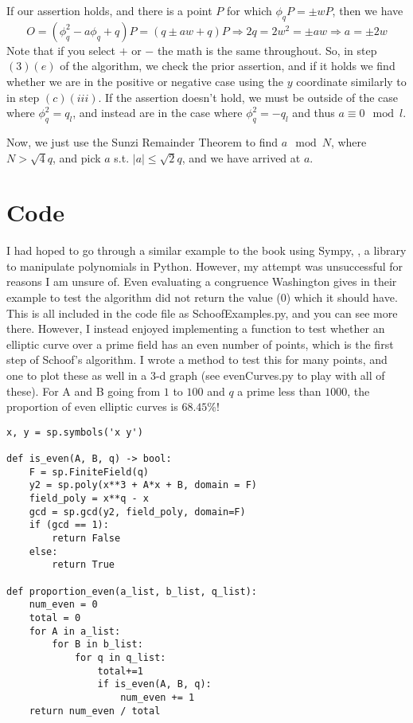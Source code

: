 \documentclass[11pt,reqno]{amsart}
\theoremstyle{definition}
\begin{document}
If our assertion holds, and there is a point $P$ for which $\phi_qP = \pm wP$, then we have $$O = (\phi_q^2 - a\phi_q+q)P = (q\pm aw+q)P \Rightarrow 2q = 2w^2 = \pm aw \Rightarrow a = \pm2w$$ Note that if you select $+$ or $-$ the math is the same throughout. So, in step $(3)(e)$ of the algorithm, we check the prior assertion, and if it holds we find whether we are in the positive or negative case using the $y$ coordinate similarly to in step $(c)(iii)$. If the assertion doesn't hold, we must be outside of the case where $\phi_q^2 = q_l$, and instead are in the case where $\phi_q^2 = -q_l$ and thus $a \equiv 0 \mod l$. 

Now, we just use the Sunzi Remainder Theorem to find $a \mod N$, where $N>\sqrt{4}q$, and pick $a$ s.t. $|a| \leq \sqrt{2}q$, and we have arrived at $a$. 





\section{Code}

I had hoped to go through a similar example to the book using Sympy, \cite{sympy}, a library to manipulate polynomials in Python. However, my attempt was unsuccessful for reasons I am unsure of. Even evaluating a congruence Washington gives in their example to test the algorithm did not return the value ($0$) which it should have. This is all included in the code file as SchoofExamples.py, and you can see more there. However, I instead enjoyed implementing a function to test whether an elliptic curve over a prime field has an even number of points, which is the first step of Schoof's algorithm. I wrote a method to test this for many points, and one to plot these as well in a 3-d graph (see evenCurves.py to play with all of these). For A and B going from $1$ to $100$ and $q$ a prime less than $1000$, the proportion of even elliptic curves is $68.45$\%!

\begin{lstlisting}
x, y = sp.symbols('x y')

def is_even(A, B, q) -> bool:
    F = sp.FiniteField(q)
    y2 = sp.poly(x**3 + A*x + B, domain = F)
    field_poly = x**q - x
    gcd = sp.gcd(y2, field_poly, domain=F)
    if (gcd == 1):
        return False
    else:
        return True
    
def proportion_even(a_list, b_list, q_list):
    num_even = 0
    total = 0
    for A in a_list:
        for B in b_list:
            for q in q_list:
                total+=1
                if is_even(A, B, q):
                    num_even += 1
    return num_even / total
\end{lstlisting}


\end{document}

